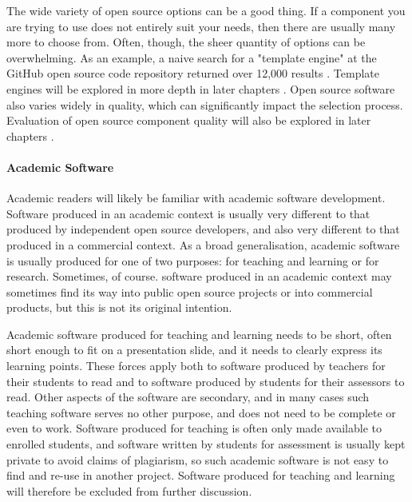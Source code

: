 The wide variety of open source options can be a good thing. If a component you are trying to use does not entirely suit your needs, then there are usually many more to choose from. Often, though, the sheer quantity of options can be overwhelming. As an example, a naive search for a "template engine" at the GitHub open source code repository returned over 12,000 results \citep{GitHub2022}. Template engines will be explored in more depth in later chapters . Open source software also varies widely in quality, which can significantly impact the selection process. Evaluation of open source component quality will also be explored in later chapters .

\paragraph{Academic Software}

Academic readers will likely be familiar with academic software development. Software produced in an academic context is usually very different to that produced by independent open source developers, and also very different to that produced in a commercial context. As a broad generalisation, academic software is usually produced for one of two purposes: for teaching and learning or for research. Sometimes, of course. software produced in an academic context may sometimes find its way into public open source projects or into commercial products, but this is not its original intention.

Academic software produced for teaching and learning needs to be short, often short enough to fit on a presentation slide, and it needs to clearly express its learning points. These forces apply both to software produced by teachers for their students to read and to software produced by students for their assessors to read. Other aspects of the software are secondary, and in many cases such teaching software serves no other purpose, and does not need to be complete or even to work. Software produced for teaching is often only made available to enrolled students, and software written by students for assessment is usually kept private to avoid claims of plagiarism, so such academic software is not easy to find and re-use in another project. Software produced for teaching and learning will therefore be excluded from further discussion.

